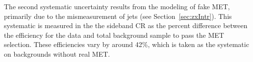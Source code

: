 


The second systematic uncertainty results from the modeling of fake MET, primarily due to the mismeasurement of jets (see Section~\ref{sec:zxIntr}). This systematic is measured in the the sideband CR as the percent difference between the efficiency for the data and total background sample to pass the MET selection. These efficiencies vary by around 42\%, which is taken as the systematic on backgrounds without real MET.

